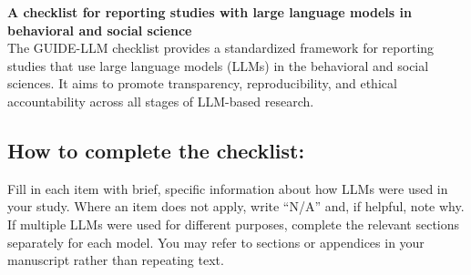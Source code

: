 \documentclass[12pt]{article}
\renewcommand{\maketitle}{
        \vspace{-2cm} \noindent 
        \textbf{\Large{A checklist for reporting studies with large language models in behavioral and social science}} \\
}
\begin{document}
\maketitle

\noindent The GUIDE-LLM checklist provides a standardized framework for reporting studies that use large language models (LLMs) in the behavioral and social sciences. It aims to promote transparency, reproducibility, and ethical accountability across all stages of LLM-based research.


\subsection*{How to complete the checklist:}

\noindent Fill in each item with brief, specific information about how LLMs were used in your study. Where an item does not apply, write “N/A” and, if helpful, note why. If multiple LLMs were used for different purposes, complete the relevant sections separately for each model. You may refer to sections or appendices in your manuscript rather than repeating text.
\end{document}
